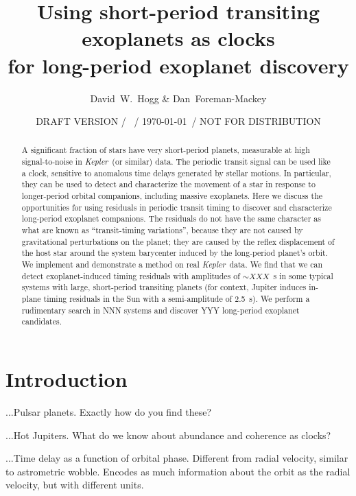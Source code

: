 \documentclass[12pt, preprint]{aastex}
\newcounter{affil}
\newcommand{\project}[1]{\textsl{#1}}
\newcommand{\Kepler}{\project{Kepler}}
\begin{document}
\title{
  Using short-period transiting exoplanets as clocks \\
  for long-period exoplanet discovery
}
\author{
  David~W.~Hogg\altaffilmark{\ref{ccpp},\ref{cds},\ref{mpia},\ref{email}}
  \&
  Dan~Foreman-Mackey\altaffilmark{\ref{ccpp}}
}
\date{DRAFT VERSION / \texttt{\githash}\ / \today\ / NOT FOR DISTRIBUTION}
\label{ccpp}
\label{cds}
\label{mpia}
\label{email}

\begin{abstract}
A significant fraction of stars have very short-period planets,
measurable at high signal-to-noise in \Kepler\ (or similar) data.
The periodic transit signal can be used like a clock, sensitive to
anomalous time delays generated by stellar motions.
In particular, they can be used to detect and characterize the
movement of a star in response to longer-period orbital companions,
including massive exoplanets.
Here we discuss the opportunities for using residuals in periodic
transit timing to discover and characterize long-period exoplanet
companions.
The residuals do not have the same character as what are known as
``transit-timing variations'', because they are not caused by
gravitational perturbations on the planet; they are caused by the
reflex displacement of the host star around the system barycenter
induced by the long-period planet's orbit.
We implement and demonstrate a method on real \Kepler\ data.  We find
that we can detect exoplanet-induced timing residuals with amplitudes
of $\sim XXX$~s in some typical systems with large, short-period
transiting planets (for context, Jupiter induces in-plane timing residuals in
the Sun with a semi-amplitude of 2.5~s).
We perform a rudimentary search in NNN systems and discover YYY
long-period exoplanet candidates.
\end{abstract}

\section{Introduction}

...Pulsar planets.  Exactly how do you find these?

...Hot Jupiters.  What do we know about abundance and coherence as
clocks?

...Time delay as a function of orbital phase.  Different from radial
velocity, similar to astrometric wobble.  Encodes as much information
about the orbit as the radial velocity, but with different units.
\end{document}
